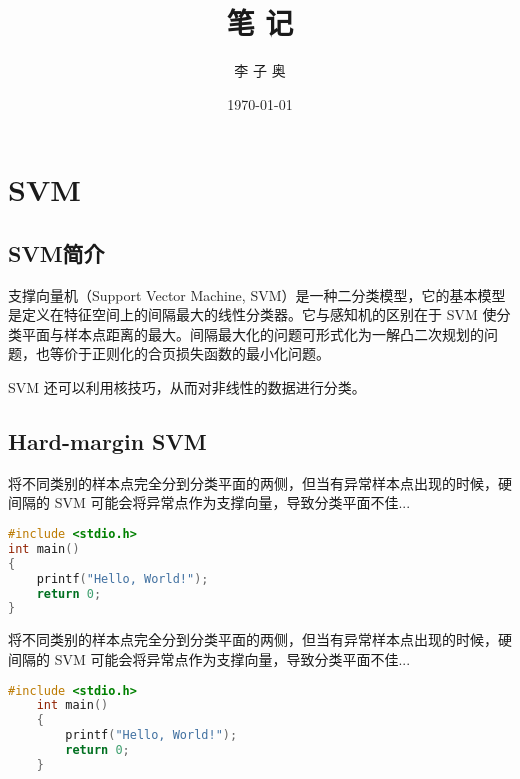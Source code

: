 \documentclass[forprint]{report}
\title{笔 记} %
\author{李 子 奥} %
\date{\today} %
\begin{document}
\maketitle
\frontmatter
{}              %

\tableofcontents
\thispagestyle{tableofcontents}				%

\mainmatter %
\baselineskip=23pt  %

\chapter{SVM}

\section{SVM简介}

支撑向量机（Support Vector Machine, SVM）是一种二分类模型\cite{r3}，它的基本模型是定义在特征空间上的间隔最大的线性分类器。它与感知机的区别在于 SVM 使分类平面与样本点距离的最大。间隔最大化的问题可形式化为一解凸二次规划的问题，也等价于正则化的合页损失函数的最小化问题。


SVM 还可以利用核技巧，从而对非线性的数据进行分类。

\section{Hard-margin SVM}

将不同类别的样本点完全分到分类平面的两侧，但当有异常样本点出现的时候，硬间隔的 SVM 可能会将异常点作为支撑向量，导致分类平面不佳\cite{r1}...

\begin{lstlisting}[language=c]
#include <stdio.h>
int main()
{
	printf("Hello, World!");
	return 0;
}
\end{lstlisting}

将不同类别的样本点完全分到分类平面的两侧，但当有异常样本点出现的时候，硬间隔的 SVM 可能会将异常点作为支撑向量，导致分类平面不佳\cite{r1}...

\begin{lstlisting}[language=c]
	#include <stdio.h>
	int main()
	{
		printf("Hello, World!");
		return 0;
	}
\end{lstlisting}
\end{document}
